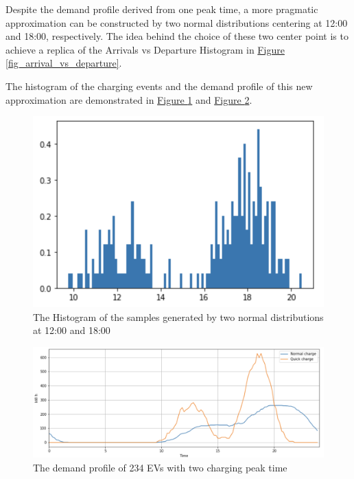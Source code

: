 \documentclass[12pt,a4paper]{report}
\begin{document}
                Despite the demand profile derived from one peak time, a more pragmatic approximation can be constructed by two normal distributions centering at 12:00 and 18:00, respectively. The idea behind the choice of these two center point is to achieve a replica of the Arrivals vs Departure Histogram in \hyperref[fig_arrival_vs_departure]{Figure \ref*{fig_arrival_vs_departure}}.

                The histogram of the charging events and the demand profile of this new approximation are demonstrated in \hyperref[fig_two_peak_histogram]{Figure \ref*{fig_two_peak_histogram}} and \hyperref[fig_charging_demand_234_2]{Figure \ref*{fig_charging_demand_234_2}}.
                \begin{figure}[ht]
                    \centerline{\includegraphics[scale=1.5]{twoPeakHist}}
                    \caption{The Histogram of the samples generated by two normal distributions at 12:00 and 18:00}
                    \label{fig_two_peak_histogram}
                \end{figure}

                \begin{figure}[ht]
                    \centerline{\includegraphics[scale=1]{chargingEventsTwoPeak}}
                    \caption{The demand profile of 234 EVs with two charging peak time}
                    \label{fig_charging_demand_234_2}
                \end{figure}
\end{document}
